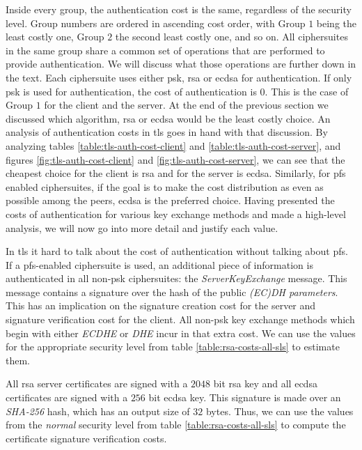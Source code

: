 \documentclass{llncs}
\begin{document}
Inside every group, the authentication cost is the same, regardless of the security level. Group numbers are ordered in ascending cost order, with Group $1$
being the least costly one, Group $2$ the second least costly one, and so on. All ciphersuites in the same group share a common set of operations that
are performed to provide authentication. We will discuss what those operations are further down in the text. Each ciphersuite uses either \gls{psk},
\gls{rsa} or \gls{ecdsa} for authentication. If only \gls{psk} is used for authentication, the cost of authentication is $0$. This is the case of Group
$1$ for the client and the server. At the end of the previous section we discussed which algorithm, \gls{rsa} or \gls{ecdsa} would be the least costly
choice. An analysis of authentication costs in \gls{tls} goes in hand with that discussion. By analyzing tables 
\ref{table:tls-auth-cost-client} and \ref{table:tls-auth-cost-server}, and figures \ref{fig:tls-auth-cost-client} and 
\ref{fig:tls-auth-cost-server}, we can see that the cheapest choice for the client is \gls{rsa} and for the
server is \gls{ecdsa}. Similarly, for \gls{pfs} enabled ciphersuites, if the goal is to make the cost distribution as even as possible among 
the peers, \gls{ecdsa} is the preferred choice. Having presented the costs of authentication for various key exchange methods 
and made a high-level analysis, we will now go into more detail and justify each value.

In \gls{tls} it hard to talk about the cost of authentication without  talking about \gls{pfs}. If a \gls{pfs}-enabled
ciphersuite is used, an additional piece of information is authenticated in all non-\gls{psk} ciphersuites: the \textit{ServerKeyExchange} message.
This message contains a signature over the hash of the public \textit{(EC)DH parameters}. This has an implication on the signature creation cost
for the server and signature verification cost for the client. All non-\gls{psk} key exchange methods which begin with either
\textit{ECDHE} or \textit{DHE} incur in that extra cost.  We can use the values for the appropriate security level from table
\ref{table:rsa-costs-all-sls} to estimate them.

All \gls{rsa} server certificates are signed with a $2048$ bit \gls{rsa} key and all \gls{ecdsa} certificates
are signed with a $256$ bit \gls{ecdsa} key. This signature is made over an \textit{SHA-256} hash, which has an output size of $32$ bytes.
Thus, we can use the values from the \textit{normal} security level from table \ref{table:rsa-costs-all-sls} to compute the certificate signature
verification costs.
\end{document}
